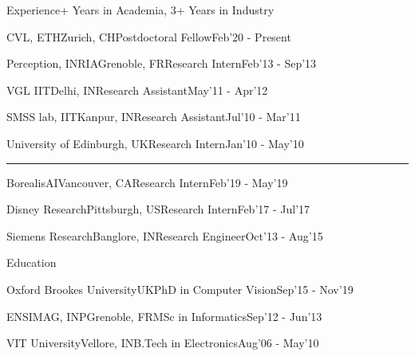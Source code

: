 \documentclass{resume} %
\begin{document}

\begin{paracol}{2}
\setlength{\columnsep}{2em}
\begin{rSection}{Experience}{+ Years in Academia, 3+ Years in Industry}
\begin{rSubsection}{CVL, ETH}{Zurich, CH}{Postdoctoral Fellow}{Feb'20 - Present}\end{rSubsection}
\begin{rSubsection}{Perception, INRIA}{Grenoble, FR}{Research Intern}{Feb'13 - Sep'13}\end{rSubsection}
\begin{rSubsection}{VGL IIT}{Delhi, IN}{Research Assistant}{May'11 - Apr'12}\end{rSubsection}
\begin{rSubsection}{SMSS lab, IIT}{Kanpur, IN}{Research Assistant}{Jul'10 - Mar'11}\end{rSubsection}
\begin{rSubsection}{University of Edinburgh}{, UK}{Research Intern}{Jan'10 - May'10}\end{rSubsection}
\sectionlineskip
\hrule
\begin{rSubsection}{BorealisAI}{Vancouver, CA}{Research Intern}{Feb'19 - May'19}\end{rSubsection}
\begin{rSubsection}{Disney Research}{Pittsburgh, US}{Research Intern}{Feb'17 - Jul'17}\end{rSubsection}
\begin{rSubsection}{Siemens Research}{Banglore, IN}{Research Engineer}{Oct'13 - Aug'15}\end{rSubsection}

\end{rSection}

\begin{rSection}{Education}{}
\begin{eSubsection}{Oxford Brookes University}{UK}{PhD in Computer Vision}{Sep'15 - Nov'19}\end{eSubsection}
\begin{eSubsection}{ENSIMAG, INP}{Grenoble, FR}{MSc in Informatics}{Sep'12 - Jun'13}\end{eSubsection}
\begin{eSubsection}{VIT University}{Vellore, IN}{B.Tech in Electronics}{Aug'06 - May'10}\end{eSubsection} 
\end{rSection}



\end{paracol}
\end{document}
